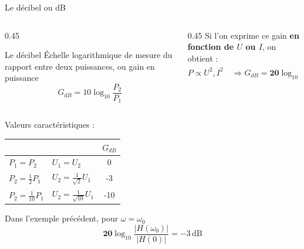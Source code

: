 \begin{frame}{Le décibel ou dB}
	\begin{columns}
  \begin{column}{0.45\textwidth}  
	\begin{block}{Le décibel}
	Échelle logarithmique de mesure du rapport entre deux  puissances, ou gain en puissance 
	\[G_{dB}=10\log_{10}\frac{P_2}{P_1}\]
	\end{block}
  \end{column}
  \begin{column}{0.45\textwidth}
	Si l'on exprime ce gain \textbf{en fonction de $U$ ou $I$}, 
	on obtient :
	\[P \propto U^2, I^2 \quad \Rightarrow G_{dB}=\mathbf{20}\log_{10}\frac{U_2}{U_1}= \mathbf{20}\log_{10}\frac{I_2}{I_1}\]
  \end{column}
\end{columns}

	
	
	Valeurs caractéristiques :
	\begin{center}
		\begin{tabular}{ll|c}
			&& $G_{dB}$\\ \hline
			$P_1=P_2$ &  $U_1=U_2$ & 0\\
			$P_2=\frac{1}{2}P_1$ & $U_2=\frac{1}{\sqrt{2}}U_1$  & -3\\
			$P_2=\frac{1}{10}P_1$ & $U_2=\frac{1}{\sqrt{10}}U_1$  & -10\\ \hline
		\end{tabular} \hspace*{1cm}
		\begin{minipage}[c]{0.35\linewidth}
			Dans l'exemple précédent, pour $\omega=\omega_0$
			\[\mathbf{20} \log_{10}\frac{|H(\omega_0)|}{|H(0)|}=-3 \, \text{dB}\]
		\end{minipage}
	\end{center}
	
	
\end{frame}

